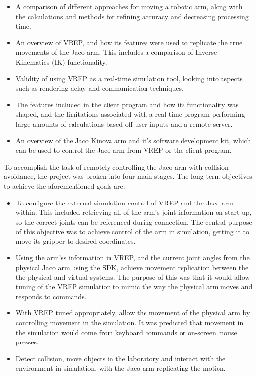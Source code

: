 \documentclass[12pt,openany,a4paper]{book}
\begin{document}
\begin{itemize}
	\item A comparison of different approaches for moving a robotic arm, along with the calculations and methods for refining accuracy and decreasing processing time.
	\item An overview of VREP, and how its features were used to replicate the true movements of the Jaco arm. This includes a comparison of Inverse Kinematics (IK) functionality. 
	\item Validity of using VREP as a real-time simulation tool, looking into aspects such as rendering delay and communication techniques.
	\item The features included in the client program and how its functionality was shaped, and the limitations associated with a real-time program performing large amounts of calculations based off user inputs and a remote server.
	\item An overview of the Jaco Kinova arm and it's software development kit, which can be used to control the Jaco arm from VREP or the client program.

\end{itemize}


To accomplish the task of remotely controlling the Jaco arm with collision avoidance, the project was broken into four main stages. The long-term objectives to achieve the aforementioned goals are:

\begin{itemize}
	\item To configure the external simulation control of VREP and the Jaco arm within. This included retrieving all of the arm's joint information on start-up, so the correct joints can be referenced during connection. The central purpose of this objective was to achieve control of the arm in simulation, getting it to move its gripper to desired coordinates.
	\item Using the arm'ss information in VREP, and the current joint angles from the physical Jaco arm using the SDK, achieve movement replication between the the physical and virtual systems. The purpose of this was that it would allow tuning of the VREP simulation to mimic the way the physical arm moves and responds to commands.
	\item With VREP tuned appropriately, allow the movement of the physical arm by controlling movement in the simulation. It was predicted that movement in the simulation would come from keyboard commands or on-screen mouse presses.
	\item Detect collision, move objects in the laboratory and interact with the environment in simulation, with the Jaco arm replicating the motion.

\end{itemize}
\end{document}
